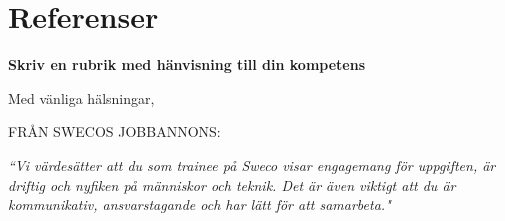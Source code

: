 \documentclass[11pt,a4paper,sans]{moderncv}        %
\begin{document}
\section{Referenser}


%


\clearpage
\date{\today}
\opening{\textbf{Skriv en rubrik med h{\"a}nvisning till din kompetens}}
\closing{Med v{\"a}nliga h{\"a}lsningar,}
\makelettertitle

FR{\AA}N SWECOS JOBBANNONS:

\textit{``Vi värdesätter att du som trainee på Sweco visar engagemang för uppgiften, är driftig och nyfiken på människor och teknik. Det är även viktigt att du är kommunikativ, ansvarstagande och har lätt för att samarbeta."}



\end{document}

